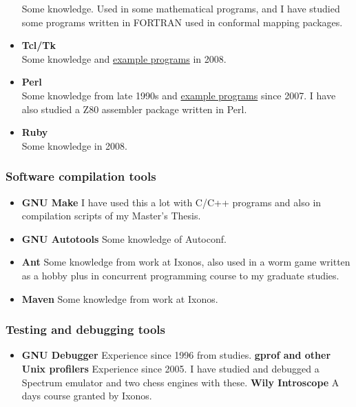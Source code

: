 \documentclass[a4paper,12pt]{article}
\begin{document}
\begin{itemize}
Some knowledge. Used in some mathematical programs, and I have studied some programs
written in FORTRAN used in conformal mapping packages.
\item
{\bf Tcl/Tk} \\
Some knowledge and \href{http://math.tkk.fi/~mnummeli/tite/tcltk.html}
{example programs} in 2008.
\item
{\bf Perl} \\
Some knowledge from late 1990s and \href{http://math.tkk.fi/~mnummeli/tite/perl.html}
{example programs} since 2007. I have also studied
a Z80 assembler package written in Perl.
\item
{\bf Ruby} \\
Some knowledge in 2008.
\end{itemize}

\subsubsection*{Software compilation tools}
\begin{itemize}
\item
{\bf GNU Make}
I have used this a lot with C/C++ programs and also in compilation scripts of
my Master's Thesis.
\item
{\bf GNU Autotools}
Some knowledge of Autoconf.
\item
{\bf Ant}
Some knowledge from work at Ixonos, also used in a worm game written as a hobby
plus in concurrent programming course to my graduate studies.
\item
{\bf Maven}
Some knowledge from work at Ixonos.
\end{itemize}

\subsubsection*{Testing and debugging tools}
\begin{itemize}
\item
{\bf GNU Debugger}
Experience since 1996 from studies.
{\bf gprof and other Unix profilers}
Experience since 2005. I have studied and debugged a Spectrum emulator and
two chess engines with these.
{\bf Wily Introscope}
A days course granted by Ixonos.
\end{itemize}
\end{document}
